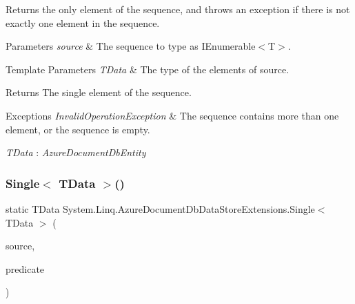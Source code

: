 Returns the only element of the sequence, and throws an exception if there is not exactly one element in the sequence. 


\begin{DoxyParams}{Parameters}
{\em source} & The sequence to type as I\+Enumerable$<$\+T$>$.\\
\hline
\end{DoxyParams}

\begin{DoxyTemplParams}{Template Parameters}
{\em T\+Data} & The type of the elements of source.\\
\hline
\end{DoxyTemplParams}
\begin{DoxyReturn}{Returns}
The single element of the sequence.
\end{DoxyReturn}

\begin{DoxyExceptions}{Exceptions}
{\em Invalid\+Operation\+Exception} & The sequence contains more than one element, or the sequence is empty.\\
\hline
\end{DoxyExceptions}
\begin{Desc}
\item[Type Constraints]\begin{description}
\item[{\em T\+Data} : {\em Azure\+Document\+Db\+Entity}]\end{description}
\end{Desc}
\mbox{\label{classSystem_1_1Linq_1_1AzureDocumentDbDataStoreExtensions_a88615fafe8c7bb0f9a0804eb4e4f0472_a88615fafe8c7bb0f9a0804eb4e4f0472}} 
\subsubsection{\texorpdfstring{Single$<$ T\+Data $>$()}{Single< TData >()}\hspace{0.1cm}{\footnotesize\ttfamily [2/2]}}
{\footnotesize\ttfamily static T\+Data System.\+Linq.\+Azure\+Document\+Db\+Data\+Store\+Extensions.\+Single$<$ T\+Data $>$ (\begin{DoxyParamCaption}\item[{this \hyperlink{classCqrs_1_1Azure_1_1DocumentDb_1_1DataStores_1_1AzureDocumentDbDataStore}{Azure\+Document\+Db\+Data\+Store}$<$ T\+Data $>$}]{source,  }\item[{Func$<$ T\+Data, bool $>$}]{predicate }\end{DoxyParamCaption})\hspace{0.3cm}{\ttfamily [static]}}



